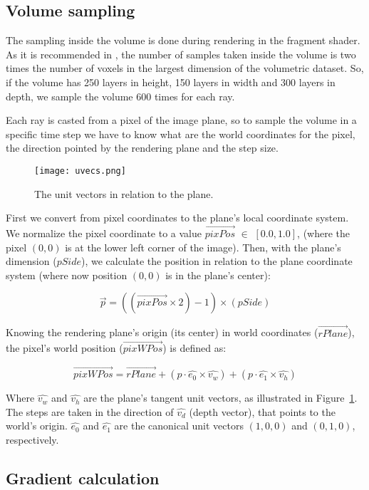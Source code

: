 \documentclass[10pt, conference]{IEEEtran}
\begin{document}
\subsection{Volume sampling}
\label{sec:volsampling}

The sampling inside the volume is done during rendering in the fragment shader. As it is recommended in \cite{RTVR}, the number of samples taken inside the volume is two times the number of voxels in the largest dimension of the volumetric dataset. So, if the volume has 250 layers in height, 150 layers in width and 300 layers in depth, we sample the volume 600 times for each ray.

Each ray is casted from a pixel of the image plane, so to sample the volume in a specific time step we have to know what are the world coordinates for the pixel, the direction pointed by the rendering plane and the step size.

\begin{figure}[h]
\centering
\texttt{[image: uvecs.png]}
\caption{The unit vectors in relation to the plane.}
\label{fig:uvecs}
\end{figure}

First we convert from pixel coordinates to the plane's local coordinate system. We normalize the pixel coordinate to a value $\vec{pixPos}$ $\in$ $[0.0, 1.0]$, (where the pixel $(0,0)$ is at the lower left corner of the image). Then, with the plane's dimension (\(pSide\)), we calculate the position in relation to the plane coordinate system (where now position $(0,0)$ is in the plane's center):


\[\vec{p} = ((\vec{pixPos} \times 2)-1) \times (pSide)\]


Knowing the rendering plane's origin (its center) in world coordinates (\(\vec{rPlane}\)), the pixel's world position (\(\vec{pixWPos}\)) is defined as:


\[\vec{pixWPos} = \vec{rPlane}+(p \cdot \hat{e_0} \times \hat{v_w})+(p \cdot \hat{e_1} \times \hat{v_h})\]

Where \(\hat{v_w}\) and \(\hat{v_h}\) are the plane's tangent unit vectors, as illustrated in Figure~\ref{fig:uvecs}. The steps are taken in the direction of \(\hat{v_d}\) (depth vector), that points to the world's origin. $\hat{e_0}$ and $\hat{e_1}$ are the canonical unit vectors $(1, 0, 0)$ and $(0, 1, 0)$, respectively.

\subsection{Gradient calculation}
\label{sec:gradient}
\end{document}
